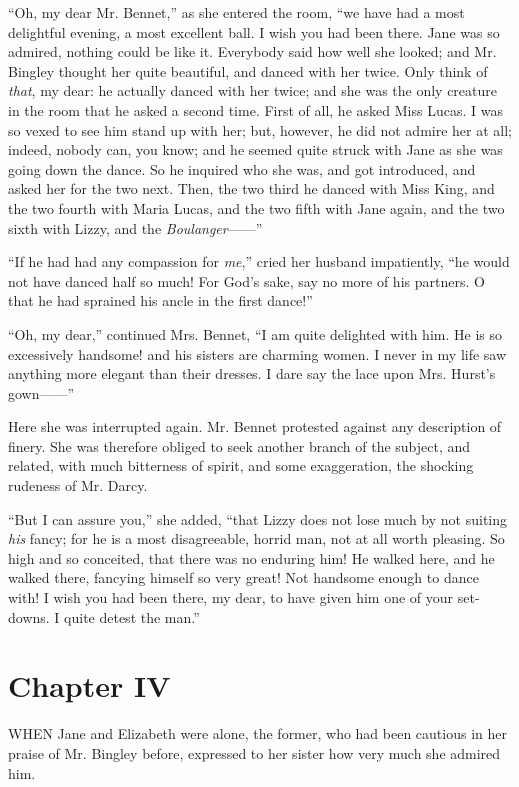\documentclass[12pt,openright]{book}
\begin{document}
“Oh, my dear Mr. Bennet,” as she entered the room, “we have had a most delightful evening, a most excellent ball. I wish you had been there. Jane was so admired, nothing could be like it. Everybody said how well she looked; and Mr. Bingley thought her quite beautiful, and danced with her twice. Only think of \textit{that}, my dear: he actually danced with her twice; and she was the only creature in the room that he asked a second time. First of all, he asked Miss Lucas. I was so vexed to see him stand up with her; but, however, he did not admire her at all; indeed, nobody can, you know; and he seemed quite struck with Jane as she was going down the dance. So he inquired who she was, and got introduced, and asked her for the two next. Then, the two third he danced with Miss King, and the two fourth with Maria Lucas, and the two fifth with Jane again, and the two sixth with Lizzy, and the \textit{Boulanger}——”

“If he had had any compassion for \textit{me},” cried her husband impatiently, “he would not have danced half so much! For God’s sake, say no more of his partners. O that he had sprained his ancle in the first dance!”

“Oh, my dear,” continued Mrs. Bennet, “I am quite delighted with him. He is so excessively handsome! and his sisters are charming women. I never in my life saw anything more elegant than their dresses. I dare say the lace upon Mrs. Hurst’s gown——”

Here she was interrupted again. Mr. Bennet protested against any description of finery. She was therefore obliged to seek another branch of the subject, and related, with much bitterness of spirit, and some exaggeration, the shocking rudeness of Mr. Darcy.

“But I can assure you,” she added, “that Lizzy does not lose much by not suiting \textit{his} fancy; for he is a most disagreeable, horrid man, not at all worth pleasing. So high and so conceited, that there was no enduring him! He walked here, and he walked there, fancying himself so very great! Not handsome enough to dance with! I wish you had been there, my dear, to have given him one of your set-downs. I quite detest the man.”

\chapter{Chapter IV}

\noindent  WHEN Jane and Elizabeth were alone, the former, who had been cautious in her praise of Mr. Bingley before, expressed to her sister how very much she admired him.
\end{document}
